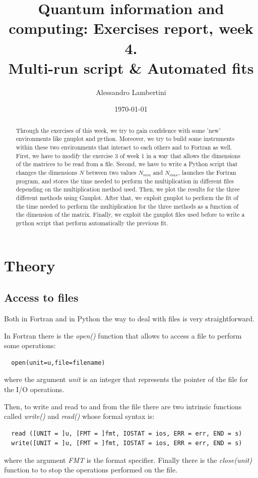 \documentclass[prb,9pt,notitlepage]{revtex4-1}
\begin{document}
\title{Quantum information and computing: Exercises report, week 4. \\ Multi-run script \& Automated fits }

\author{Alessandro Lambertini}


\date{\today}

\begin{abstract}
Through the exercises of this week, we try to gain confidence with some 'new' environments like gnuplot and python. Moreover, we try to build some instruments within these two environments that interact to each others and to Fortran as well. First, we have to modify the exercise 3 of week 1 in a way that allows the dimensions of the matrices to be read from a file. Second, we have to write a Python script that changes the dimensions $N$ between two values $N_{min}$ and $N_{max}$, launches the Fortran program, and stores the time needed to perform the multiplication in different files depending on the multiplication method used. Then, we plot the results for the three different methods using Gnuplot. After that, we exploit gnuplot to perform the fit of the time needed to perform the multiplication for the three methods as a function of the dimension of the matrix. Finally, we exploit the gnuplot files used before to write a python script that perform automatically the previous fit.
\end{abstract}

\maketitle

\section{Theory}
\subsection{Access to files}
Both in Fortran and in Python the way to deal with files is very straightforward.

In Fortran there is the \textit{open()} function that allows to access a file to perform some operations:
\begin{lstlisting}
  open(unit=u,file=filename)
\end{lstlisting}
where the argument \textit{unit} is an integer that represents the pointer of the file for the I/O operations.

Then, to write and read to and from the file there are two intrinsic functions called \textit{write()} and \textit{read()}
whose formal syntax is:
\begin{lstlisting}
  read ([UNIT = ]u, [FMT = ]fmt, IOSTAT = ios, ERR = err, END = s)
  write([UNIT = ]u, [FMT = ]fmt, IOSTAT = ios, ERR = err, END = s)
\end{lstlisting}
where the argument \textit{FMT} is the format specifier.
Finally there is the \textit{close(unit)} function to to stop the operations performed on the file.
\end{document}

